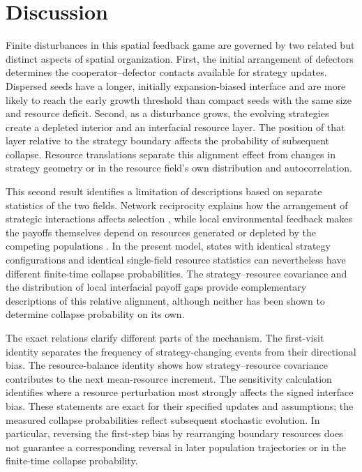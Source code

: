 \section{Discussion}

Finite disturbances in this spatial feedback game are governed by two related but distinct aspects of spatial organization. First, the initial arrangement of defectors determines the cooperator--defector contacts available for strategy updates. Dispersed seeds have a longer, initially expansion-biased interface and are more likely to reach the early growth threshold than compact seeds with the same size and resource deficit. Second, as a disturbance grows, the evolving strategies create a depleted interior and an interfacial resource layer. The position of that layer relative to the strategy boundary affects the probability of subsequent collapse. Resource translations separate this alignment effect from changes in strategy geometry or in the resource field's own distribution and autocorrelation.

This second result identifies a limitation of descriptions based on separate statistics of the two fields. Network reciprocity explains how the arrangement of strategic interactions affects selection \cite{szabo2007graphs,perc2017cooperation}, while local environmental feedback makes the payoffs themselves depend on resources generated or depleted by the competing populations \cite{lin2019spatial,chen2025localized}. In the present model, states with identical strategy configurations and identical single-field resource statistics can nevertheless have different finite-time collapse probabilities. The strategy--resource covariance and the distribution of local interfacial payoff gaps provide complementary descriptions of this relative alignment, although neither has been shown to determine collapse probability on its own.

The exact relations clarify different parts of the mechanism. The first-visit identity separates the frequency of strategy-changing events from their directional bias. The resource-balance identity shows how strategy--resource covariance contributes to the next mean-resource increment. The sensitivity calculation identifies where a resource perturbation most strongly affects the signed interface bias. These statements are exact for their specified updates and assumptions; the measured collapse probabilities reflect subsequent stochastic evolution. In particular, reversing the first-step bias by rearranging boundary resources does not guarantee a corresponding reversal in later population trajectories or in the finite-time collapse probability.

